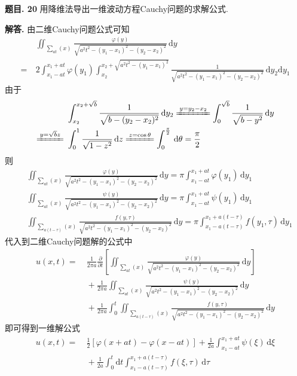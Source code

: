 \documentclass[12pt, a4paper, oneside]{ctexart}
\newcounter{problem}  %
\newenvironment{problem}[1][]{\stepcounter{problem}\par\noindent\textbf{题目\arabic{problem}. #1}}{\smallskip\par}
\newenvironment{solution}{\par\noindent\textbf{解答. }}{\smallskip\par}
\def\d{\mathrm{d}}          %
\begin{document}
\begin{problem}[20]
    用降维法导出一维波动方程Cauchy问题的求解公式.
\end{problem}
\begin{solution}
    由二维Cauchy问题公式可知
    \begin{align*}
        &\ \iint_{\sum_{at}(x)}\frac{\varphi(y)}{\sqrt{a^2t^2-(y_1-x_1)^2-(y_2-x_2)^2}}\,\d y\\
        =&\ 2\int_{x_1-at}^{x_1+at}\varphi(y_1)\int_{x_2}^{x_2+\sqrt{a^2t^2-(y_1-x_1)^2}}\frac{1}{\sqrt{a^2t^2-(y_1-x_1)^2-(y_2-x_2)^2}}\,\d y_2\d y_1
    \end{align*}
    由于\begin{align*}
        &\ \int_{x_2}^{x_2+\sqrt{b}}\frac{1}{\sqrt{b-(y_2-x_2)^2}}\,\d y_2\xlongequal{y=y_2-x_2}\int_0^{\sqrt{b}}\frac{1}{\sqrt{b-y^2}}\,\d y\\
        \xlongequal{y=\sqrt{b}z}&\ \int_0^1\frac{1}{\sqrt{1-z^2}}\,\d z\xlongequal{z=\cos \theta}\int_0^{\frac{\pi}{2}}\,\d \theta = \frac{\pi}{2}
    \end{align*}
    则
    \begin{align*}
        &\ \iint_{\sum_{at}(x)}\frac{\varphi(y)}{\sqrt{a^2t^2-(y_1-x_1)^2-(y_2-x_2)^2}}\,\d y = \pi\int_{x_1-at}^{x_1+at}\varphi(y_1)\,\d y_1\\
        &\ \iint_{\sum_{at}(x)}\frac{\psi(y)}{\sqrt{a^2t^2-(y_1-x_1)^2-(y_2-x_2)^2}}\,\d y = \pi\int_{x_1-at}^{x_1+at}\psi(y_1)\,\d y_1\\
        &\ \iint_{\sum_{a(t-\tau)}(x)}\frac{f(y,\tau)}{\sqrt{a^2t^2-(y_1-x_1)^2-(y_2-x_2)^2}}\,\d y = \pi\int_{x_1-a(t-\tau)}^{x_1+a(t-\tau)}f(y_1,\tau)\,\d y_1
    \end{align*}
    代入到二维Cauchy问题解的公式中
    \begin{align*}
        u(x,t) =&\ \frac{1}{2\pi a}\frac{\partial}{\partial t}\left[\iint_{\sum_{at}(x)}\frac{\varphi(y)}{\sqrt{a^2t^2-(y_1-x_1)^2-(y_2-x_2)^2}}\,\d y\right]\\
        &\ +\frac{1}{2\pi a}\iint_{\sum_{at}(x)}\frac{\psi(y)}{\sqrt{a^2t^2-(y_1-x_1)^2-(y_2-x_2)^2}}\,\d y\\
        &\ +\frac{1}{2\pi a}\int_0^t\iint_{\sum_{a(t-\tau)}(x)}\frac{f(y,\tau)}{\sqrt{a^2t^2-(y_1-x_1)^2-(y_2-x_2)^2}}\,\d y
    \end{align*}
    即可得到一维解公式
    \begin{align*}
        u(x,t) =&\ \frac{1}{2}[\varphi(x+at)-\varphi(x-at)]+\frac{1}{2a}\int_{x_1-at}^{x_1+at}\psi(\xi)\,\d \xi\\
        &\ +\frac{1}{2a}\int_0^t\d t\int_{x_1-a(t-\tau)}^{x_1+a(t-\tau)}f(\xi,\tau)\,\d\tau
    \end{align*}
\end{solution}
\end{document}
